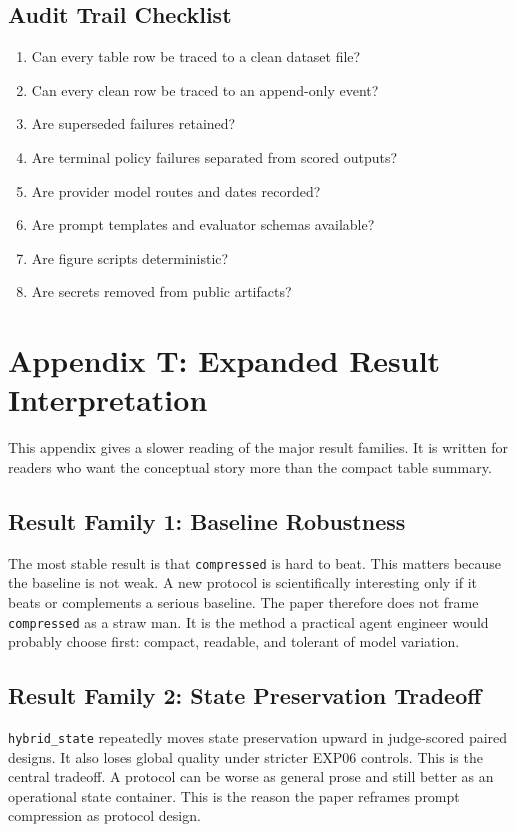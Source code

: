 \documentclass[11pt]{article}
\begin{document}
\subsection{Audit Trail Checklist}
\begin{enumerate}
\item Can every table row be traced to a clean dataset file?
\item Can every clean row be traced to an append-only event?
\item Are superseded failures retained?
\item Are terminal policy failures separated from scored outputs?
\item Are provider model routes and dates recorded?
\item Are prompt templates and evaluator schemas available?
\item Are figure scripts deterministic?
\item Are secrets removed from public artifacts?
\end{enumerate}

\clearpage
\section{Appendix T: Expanded Result Interpretation}
This appendix gives a slower reading of the major result families. It is written for readers who want the conceptual story more than the compact table summary.

\subsection{Result Family 1: Baseline Robustness}
The most stable result is that \texttt{compressed} is hard to beat. This matters because the baseline is not weak. A new protocol is scientifically interesting only if it beats or complements a serious baseline. The paper therefore does not frame \texttt{compressed} as a straw man. It is the method a practical agent engineer would probably choose first: compact, readable, and tolerant of model variation.

\subsection{Result Family 2: State Preservation Tradeoff}
\texttt{hybrid\_state} repeatedly moves state preservation upward in judge-scored paired designs. It also loses global quality under stricter EXP06 controls. This is the central tradeoff. A protocol can be worse as general prose and still better as an operational state container. This is the reason the paper reframes prompt compression as protocol design.
\end{document}
